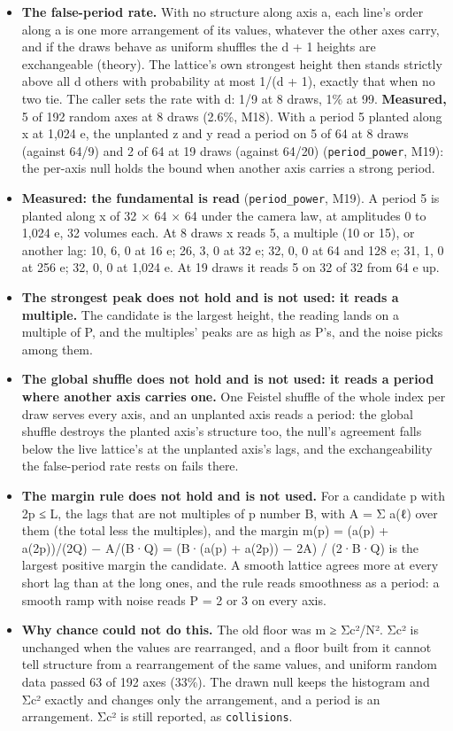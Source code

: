 \begin{itemize}
\item \textbf{The false-period rate.} With no structure along axis a, each line's order along a is one more arrangement of its values, whatever the other axes carry, and if the draws behave as uniform shuffles the d + 1 heights are exchangeable (theory). The lattice's own strongest height then stands strictly above all d others with probability at most 1/(d + 1), exactly that when no two tie. The caller sets the rate with d: 1/9 at 8 draws, 1\% at 99. \textbf{Measured,} 5 of 192 random axes at 8 draws (2.6\%, M18). With a period 5 planted along x at 1,024 e, the unplanted z and y read a period on 5 of 64 at 8 draws (against 64/9) and 2 of 64 at 19 draws (against 64/20) (\texttt{period\_\allowbreak{}power}, M19): the per-axis null holds the bound when another axis carries a strong period.
\item \textbf{Measured: the fundamental is read} (\texttt{period\_\allowbreak{}power}, M19). A period 5 is planted along x of 32 × 64 × 64 under the camera law, at amplitudes 0 to 1,024 e, 32 volumes each. At 8 draws x reads 5, a multiple (10 or 15), or another lag: 10, 6, 0 at 16 e; 26, 3, 0 at 32 e; 32, 0, 0 at 64 and 128 e; 31, 1, 0 at 256 e; 32, 0, 0 at 1,024 e. At 19 draws it reads 5 on 32 of 32 from 64 e up.
\item \textbf{The strongest peak does not hold and is not used: it reads a multiple.} The candidate is the largest height, the reading lands on a multiple of P, and the multiples' peaks are as high as P's, and the noise picks among them.
\item \textbf{The global shuffle does not hold and is not used: it reads a period where another axis carries one.} One Feistel shuffle of the whole index per draw serves every axis, and an unplanted axis reads a period: the global shuffle destroys the planted axis's structure too, the null's agreement falls below the live lattice's at the unplanted axis's lags, and the exchangeability the false-period rate rests on fails there.
\item \textbf{The margin rule does not hold and is not used.} For a candidate p with 2p ≤ L, the lags that are not multiples of p number B, with A = Σ a(ℓ) over them (the total less the multiples), and the margin m(p) = (a(p) + a(2p))/(2Q) − A/(B·Q) = (B·(a(p) + a(2p)) − 2A) / (2·B·Q) is the largest positive margin the candidate. A smooth lattice agrees more at every short lag than at the long ones, and the rule reads smoothness as a period: a smooth ramp with noise reads P = 2 or 3 on every axis.
\item \textbf{Why chance could not do this.} The old floor was m ≥ Σc²/N². Σc² is unchanged when the values are rearranged, and a floor built from it cannot tell structure from a rearrangement of the same values, and uniform random data passed 63 of 192 axes (33\%). The drawn null keeps the histogram and Σc² exactly and changes only the arrangement, and a period is an arrangement. Σc² is still reported, as \texttt{collisions}.

\end{itemize}
